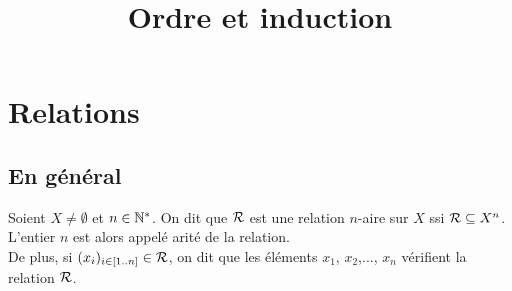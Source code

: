 
\usepackage{euscript}
\newcommand{\Min}{\escr{M}\rm{in}} 
\newcommand{\Maj}{\escr{M}\rm{aj}}
\newcommand{\escr}[1]{\EuScript{#1}}

\newcommand{\constr}[2]{|_{#2}^{#1}}
\newcommand{\varconstr}[2]{|_{\scriptscriptstyle #2}^{\scriptscriptstyle #1}}

\makeatletter
\DeclareRobustCommand{\ubigcup}{\DOTSB\mathop{\,\ubigcup@\,}\slimits@}
\DeclareRobustCommand{\dbigcap}{\DOTSB\mathop{\,\dbigcap@\,}\slimits@}

\newcommand{\ubigcup@}{\mathpalette\ubigcup@@\relax}
\newcommand{\ubigcup@@}[2]{%
	\begingroup
	\sbox\z@{$\m@th#1\bigcup$}%
	\sbox\tw@{$\m@th#1\uparrow$}%
	\copy\z@
	\mkern-6.3mu\ifx#1\scriptscriptstyle\mkern0.3mu\fi
	\dimen@=\dimexpr\ht\z@-\ht\tw@
	\ifx#1\displaystyle\else
	\ifx#1\scriptscriptstyle\advance\dimen@ 0.5pt\else
	\advance\dimen@ 1pt
	\fi\fi
	\raisebox{\dimen@}[0pt][0pt]{\rlap{\copy\tw@}}%
	\mkern6.3mu\ifx#1\scriptscriptstyle\mkern-0.3mu\fi
	\endgroup
}
\newcommand{\dbigcap@}{\mathpalette\dbigcap@@\relax}
\newcommand{\dbigcap@@}[2]{%
	\begingroup
	\sbox\z@{$\m@th#1\bigcap$}%
	\sbox\tw@{$\m@th#1\downarrow$}%
	\copy\z@
	\mkern-6.3mu\ifx#1\scriptscriptstyle\mkern0.3mu\fi
	\dimen@=\dimexpr\dp\z@-\dp\tw@
	\ifx#1\displaystyle\else
	\ifx#1\scriptscriptstyle\advance\dimen@ 0.5pt\else
	\advance\dimen@ 1pt
	\fi\fi
	\raisebox{-\dimen@}[0pt][0pt]{\rlap{\copy\tw@}}%
	\mkern6.3mu\ifx#1\scriptscriptstyle\mkern-0.3mu\fi
	\endgroup
}

\makeatother




\title{Ordre et induction}

	\section{Relations}
	
		\subsection{En général}
			
			\begin{Definition}
				Soient \(X \neq \emptyset\) et \(n \in \bb{N}^*\). On dit que \(\cal{R}\) est une relation \(n\)-aire sur \(X\) ssi \(\cal{R} \subseteq X^n\). \nt
				L'entier \(n\) est alors appelé arité de la relation. \\
				De plus, si \((x_i)_{i \in [1..n]} \in \cal{R}\), on dit que les éléments \(x_1\), \(x_2\),..., \(x_n\) vérifient la relation \(\cal{R}\).
			\end{Definition}
			
